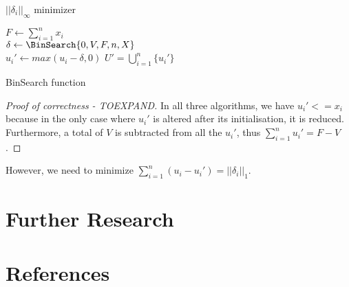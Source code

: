 \documentclass[11pt]{article}
\theoremstyle{definition}
\theoremstyle{corollary}
\begin{document}
    \begin{algorithm}[H]
       \caption{$||\delta_i||_\infty$ minimizer}
       $F \gets \sum\limits_{i=1}^{n}x_i$ \\
       $\delta \gets \BinSearch{0,V,F,n,X}$ \\
          {$u_i' \gets max(u_i - \delta, 0)$}
       \Return $U' = \bigcup\limits_{i=1}^{n}\{u_i'\}$
    \end{algorithm}
    \begin{algorithm}[H]
       \Output{$\delta$}
       \caption{BinSearch function}
    \end{algorithm}
    \begin{proof}[Proof of correctness - TOEXPAND]
       In all three algorithms, we have $u_i' <= x_i$ because in the only case where $u_i'$ is altered after its
       initialisation, it is reduced. Furthermore, a total of $V$ is subtracted from all the $u_i'$, thus
       $\sum\limits_{i=1}^{n}u_i' = F - V$.
    \end{proof}

    However, we need to minimize $\sum\limits_{i=1}^{n}(u_i-u_i') = ||\delta_i||_1$.

  \section{Further Research}

  \section{References}
\end{document}
